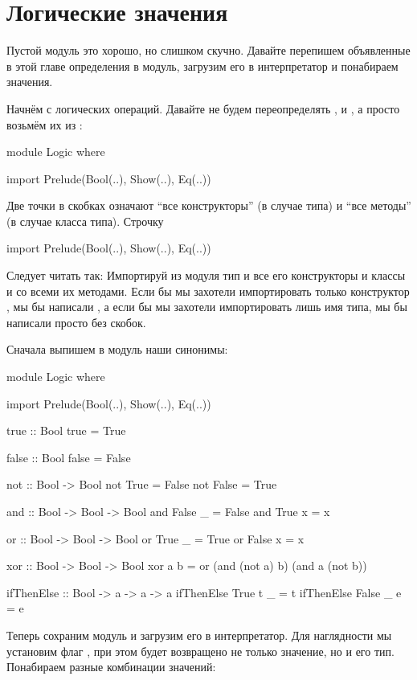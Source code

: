 \section{Логические значения}

Пустой модуль это хорошо, но слишком скучно. Давайте перепишем
объявленные в этой главе определения в модуль, загрузим его в
интерпретатор и понабираем значения.

Начнём с логических операций. Давайте не будем переопределять ,
 и , а просто возьмём их из :


\begin{code}
module Logic where

import Prelude(Bool(..), Show(..), Eq(..))
\end{code}

Две точки в скобках означают ``все конструкторы'' (в случае типа) и
``все методы'' (в случае класса типа). Строчку


\begin{code}
import Prelude(Bool(..), Show(..), Eq(..))
\end{code}

Следует читать так: Импортируй из модуля  тип  и
все его конструкторы и классы  и  со всеми их методами.
Если бы мы захотели импортировать только конструктор , мы бы
написали , а если бы мы захотели импортировать лишь имя
типа, мы бы написали просто  без скобок.

Сначала выпишем в модуль наши синонимы:


\begin{code}
module Logic where

import Prelude(Bool(..), Show(..), Eq(..))
  
true :: Bool 
true = True

false :: Bool
false = False

not :: Bool -> Bool
not True  = False
not False = True

and :: Bool -> Bool -> Bool
and False  _  = False
and True   x  = x

or  :: Bool -> Bool -> Bool
or True   _ = True
or False  x = x

xor :: Bool -> Bool -> Bool
xor a b = or (and (not a) b) (and a (not b))

ifThenElse :: Bool -> a -> a -> a
ifThenElse True   t  _ = t
ifThenElse False  _  e = e
\end{code}

Теперь сохраним модуль и загрузим его в интерпретатор. Для наглядности
мы установим флаг , при этом будет возвращено не только значение,
но и его тип. Понабираем разные комбинации значений:


